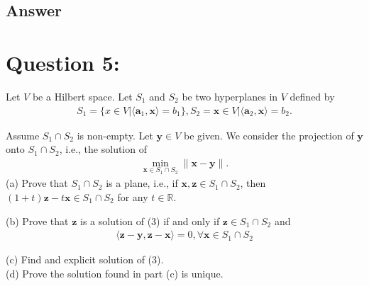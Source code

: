 \documentclass[a4paper,12pt]{article}
\newcommand{\R}{\mathbb{R}}
\begin{document}
\subsection*{Answer}

\section*{Question 5:}
Let \(V\) be a Hilbert space. Let \(S_1\) and \(S_2\) be two hyperplanes in \(V\) defined by
\begin{align*}
    S_1 = \{x \in V | \langle \bm{a}_1, \bm{x}\rangle = b_1\}, S_2 = {\bm{x} \in V | \langle \bm{a}_2, \bm{x} \rangle = b_2}.
\end{align*}

Assume \(S_1 \cap S_2\) is non-empty. Let \(\bm{y} \in V\) be given. We consider the projection of \(\bm{y}\) onto \(S_1 \cap S_2\), i.e.,
the solution of 
\begin{align}
    \min_{\bm{x} \in S_1 \cap S_2}\|\bm{x} - \bm{y}\|.
\end{align}
(a) Prove that \(S_1 \cap S_2\) is a plane, i.e., if \(\bm{x}, \bm{z} \in S_1 \cap S_2\), then \((1 + t)\bm{z} - t\bm{x} \in S_1 \cap S_2\) for any \(t \in \R\). 

(b) Prove that \(\bm{z}\) is a solution of (3) if and only if \(\bm{z} \in S_1 \cap S_2\) and 
\begin{align}
    \langle \bm{z} - \bm{y}, \bm{z} - \bm{x}\rangle = 0, \forall \bm{x} \in S_1 \cap S_2
\end{align}

(c) Find and explicit solution of (3). \\

(d) Prove the solution found in part (c) is unique. \\
\end{document}
